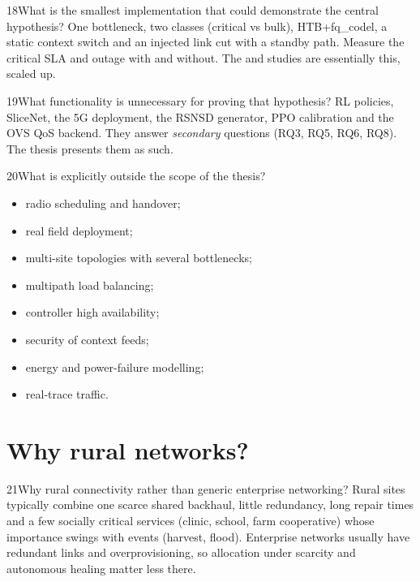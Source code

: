 \begin{qa}{18}{What is the smallest implementation that could demonstrate the central hypothesis?}
One bottleneck, two classes (critical vs bulk), HTB+fq\_codel, a static context switch and an injected link cut with a
standby path. Measure the critical SLA and outage with and without. The  and  studies
are essentially this, scaled up.
\end{qa}

\begin{qa}{19}{What functionality is unnecessary for proving that hypothesis?}
RL policies, SliceNet, the 5G deployment, the RSNSD generator, PPO calibration and the OVS QoS backend. They answer
\emph{secondary} questions (RQ3, RQ5, RQ6, RQ8). The thesis presents them as such.
\end{qa}

\begin{qa}{20}{What is explicitly outside the scope of the thesis?}
\begin{itemize}
\item radio scheduling and handover;
\item real field deployment;
\item multi-site topologies with several bottlenecks;
\item multipath load balancing;
\item controller high availability;
\item security of context feeds;
\item energy and power-failure modelling;
\item real-trace traffic.
\end{itemize}
\end{qa}

\section{Why rural networks?}

\begin{qa}{21}{Why rural connectivity rather than generic enterprise networking?}
Rural sites typically combine one scarce shared backhaul, little redundancy, long repair times and a few socially
critical services (clinic, school, farm cooperative) whose importance swings with events (harvest, flood). Enterprise
networks usually have redundant links and overprovisioning, so allocation under scarcity and autonomous healing
matter less there.
\end{qa}

